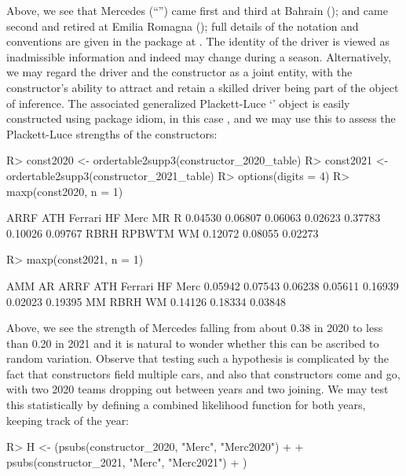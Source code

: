 \documentclass[article]{jss}
\begin{document}
%
Above, we see that Mercedes (``'') came first and third at
Bahrain (); and came second and retired at Emilia Romagna
(); full details of the notation and conventions are given
in the package at .  The identity of the driver
is viewed as inadmissible information and indeed may change during a
season.  Alternatively, we may regard the driver and the constructor
as a joint entity, with the constructor's ability to attract and
retain a skilled driver being part of the object of inference.  The
associated generalized Plackett-Luce `' object is easily
constructed using package idiom, in this case
, and we may use this to assess the
Plackett-Luce strengths of the constructors:
%
\begin{Schunk}
\begin{Sinput}
R> const2020 <- ordertable2supp3(constructor_2020_table)
R> const2021 <- ordertable2supp3(constructor_2021_table)
R> options(digits = 4)
R> maxp(const2020, n = 1)
\end{Sinput}
\begin{Soutput}
   ARRF     ATH Ferrari      HF    Merc      MR       R 
0.04530 0.06807 0.06063 0.02623 0.37783 0.10026 0.09767 
   RBRH  RPBWTM      WM 
0.12072 0.08055 0.02273 
\end{Soutput}
\begin{Sinput}
R> maxp(const2021, n = 1)
\end{Sinput}
\begin{Soutput}
    AMM      AR    ARRF     ATH Ferrari      HF    Merc 
0.05942 0.07543 0.06238 0.05611 0.16939 0.02023 0.19395 
     MM    RBRH      WM 
0.14126 0.18334 0.03848 
\end{Soutput}
\end{Schunk}
%
Above, we see the strength of Mercedes falling from about 0.38 in 2020
to less than 0.20 in 2021 and it is natural to wonder whether this can
be ascribed to random variation.  Observe that testing such a
hypothesis is complicated by the fact that constructors field multiple
cars, and also that constructors come and go, with two 2020 teams
dropping out between years and two joining.  We may test this
statistically by defining a combined likelihood function for both
years, keeping track of the year:
%
\begin{Schunk}
\begin{Sinput}
R> H <- (psubs(constructor_2020, "Merc", "Merc2020") +
+      psubs(constructor_2021, "Merc", "Merc2021")
+    )
\end{Sinput}
\end{Schunk}
\end{document}
